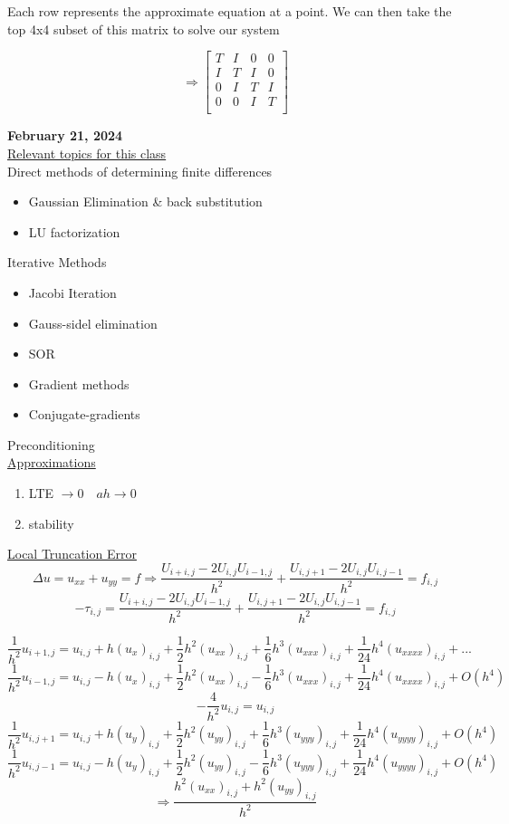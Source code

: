 \documentclass[10pt]{article}
\newcommand{\1}{\mathbb{1}}
\begin{document}
Each row represents the approximate equation at a point. We can then take the top 4x4 subset of this matrix to solve our system 

\[\Rightarrow \begin{bmatrix}
T & I & 0 & 0\\
I & T & I & 0\\
0 & I & T & I\\
0 & 0 & I & T\\
\end{bmatrix}
\]

\textbf{February 21, 2024 }\\

\underline{Relevant topics for this class}\\

Direct methods of determining finite differences
\begin{itemize}
    \item Gaussian Elimination \& back substitution
    \item LU factorization
    \end{itemize}
Iterative Methods
\begin{itemize}
    \item Jacobi Iteration
    \item Gauss-sidel elimination
    \item SOR
    \item Gradient methods
    \item Conjugate-gradients
    \end{itemize}
Preconditioning\\

\underline{Approximations}
\begin{enumerate}
    \item LTE $\to 0 \quad a h \to 0$
    \item stability
    \end{enumerate}

\underline{Local Truncation Error}\\
\[\Delta u = u_{xx} + u_{yy} = f \Rightarrow \frac{U_{i+i, j} - 2U_{i,j} U_{i-1, j}}{h^2} + \frac{U_{i, j+1} - 2U_{i,j} U_{i, j-1}}{h^2} = f_{i,j}\]
\[-\tau_{i,j} =  \frac{U_{i+i, j} - 2U_{i,j} U_{i-1, j}}{h^2} + \frac{U_{i, j+1} - 2U_{i,j} U_{i, j-1}}{h^2} = f_{i,j}\]

\[\frac{1}{h^2} u_{i+1, j} = u_{i,j} + h(u_x)_{i,j} + \frac{1}{2}h^2(u_{xx})_{i,j} + \frac{1}{6} h^3 (u_{xxx})_{i,j} + \frac{1}{24} h^4 (u_{xxxx})_{i,j} + ...\]
\[\frac{1}{h^2} u_{i-1, j} = u_{i,j} - h(u_x)_{i,j} + \frac{1}{2}h^2(u_{xx})_{i,j} - \frac{1}{6} h^3 (u_{xxx})_{i,j} + \frac{1}{24} h^4 (u_{xxxx})_{i,j} + O(h^4)\] 
\[-\frac{4}{h^2} u_{i,j} = u_{i,j}\]
\[\frac{1}{h^2} u_{i, j + 1} = u_{i,j} + h(u_y)_{i,j} + \frac{1}{2}h^2(u_{yy})_{i,j} + \frac{1}{6} h^3 (u_{yyy})_{i,j} + \frac{1}{24} h^4 (u_{yyyy})_{i,j} + O(h^4)\] 
\[\frac{1}{h^2}u_{i, j - 1} = u_{i,j} - h(u_y)_{i,j} + \frac{1}{2}h^2(u_{yy})_{i,j} - \frac{1}{6} h^3 (u_{yyy})_{i,j} + \frac{1}{24} h^4 (u_{yyyy})_{i,j} + O(h^4)\]
\[\Rightarrow \frac{h^2 (u_{xx})_{i,j} + h^2 (u_{yy})_{i,j}}{h^2}\]
\end{document}
